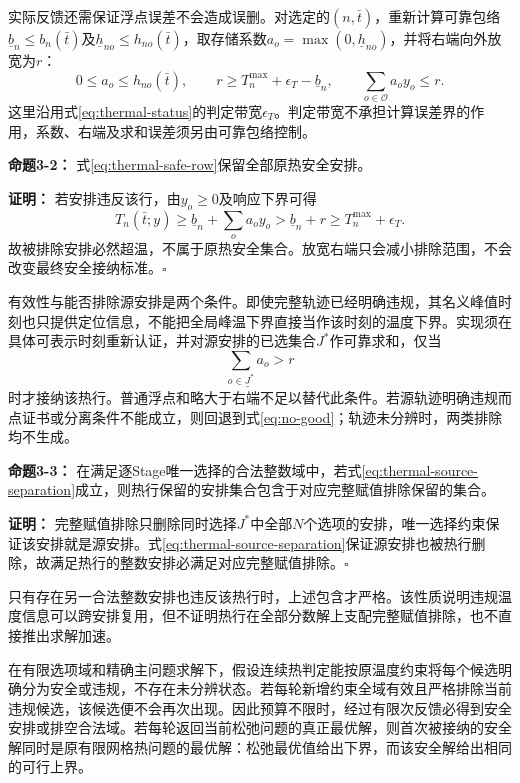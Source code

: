 实际反馈还需保证浮点误差不会造成误删。对选定的\((n,\bar t)\)，重新计算可靠包络\(\underline b_n\le b_n(\bar t)\)及\(\underline h_{no}\le h_{no}(\bar t)\)，取存储系数\(a_o=\max(0,\underline h_{no})\)，并将右端向外放宽为\(r\)：
\begin{equation}
0\le a_o\le h_{no}(\bar t),\qquad
r\ge T_n^{\max}+\epsilon_T-\underline b_n,\qquad
\sum_{o\in\mathcal O}a_oy_o\le r.
\label{eq:thermal-safe-row}
\end{equation}
这里沿用式\eqref{eq:thermal-status}的判定带宽\(\epsilon_T\)。判定带宽不承担计算误差界的作用，系数、右端及求和误差须另由可靠包络控制。

\textbf{命题3-2：} 式\eqref{eq:thermal-safe-row}保留全部原热安全安排。

\textbf{证明：} 若安排违反该行，由\(y_o\ge0\)及响应下界可得
\begin{equation}
T_n(\bar t;y)\ge\underline b_n+\sum_o a_oy_o
>\underline b_n+r\ge T_n^{\max}+\epsilon_T.
\label{eq:thermal-row-validity}
\end{equation}
故被排除安排必然超温，不属于原热安全集合。放宽右端只会减小排除范围，不会改变最终安全接纳标准。\hfill$\square$

有效性与能否排除源安排是两个条件。即使完整轨迹已经明确违规，其名义峰值时刻也只提供定位信息，不能把全局峰温下界直接当作该时刻的温度下界。实现须在具体可表示时刻重新认证，并对源安排的已选集合\(J^*\)作可靠求和，仅当
\begin{equation}
\underline{\sum_{o\in J^*}a_o}>r
\label{eq:thermal-source-separation}
\end{equation}
时才接纳该热行。普通浮点和略大于右端不足以替代此条件。若源轨迹明确违规而点证书或分离条件不能成立，则回退到式\eqref{eq:no-good}；轨迹未分辨时，两类排除均不生成。

\textbf{命题3-3：} 在满足逐Stage唯一选择的合法整数域中，若式\eqref{eq:thermal-source-separation}成立，则热行保留的安排集合包含于对应完整赋值排除保留的集合。

\textbf{证明：} 完整赋值排除只删除同时选择\(J^*\)中全部\(N\)个选项的安排，唯一选择约束保证该安排就是源安排。式\eqref{eq:thermal-source-separation}保证源安排也被热行删除，故满足热行的整数安排必满足对应完整赋值排除。\hfill$\square$

只有存在另一合法整数安排也违反该热行时，上述包含才严格。该性质说明违规温度信息可以跨安排复用，但不证明热行在全部分数解上支配完整赋值排除，也不直接推出求解加速。

在有限选项域和精确主问题求解下，假设连续热判定能按原温度约束将每个候选明确分为安全或违规，不存在未分辨状态。若每轮新增约束全域有效且严格排除当前违规候选，该候选便不会再次出现。因此预算不限时，经过有限次反馈必得到安全安排或排空合法域。若每轮返回当前松弛问题的真正最优解，则首次被接纳的安全解同时是原有限网格热问题的最优解：松弛最优值给出下界，而该安全解给出相同的可行上界。

